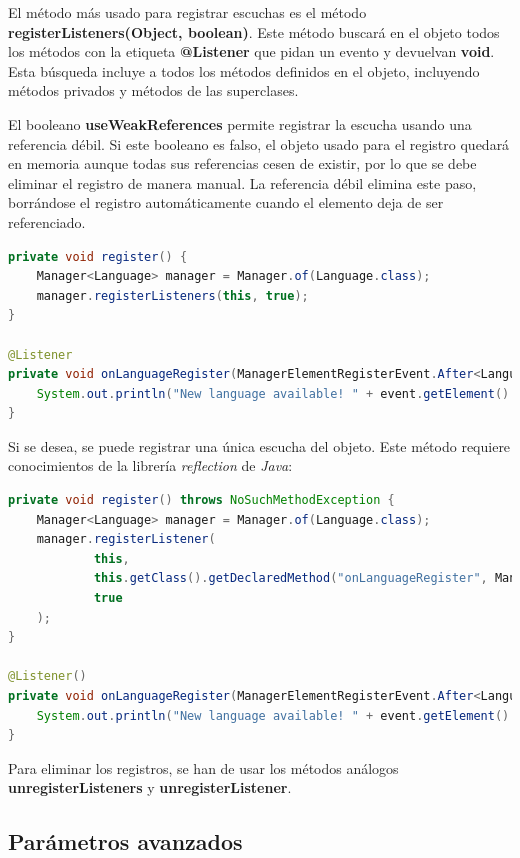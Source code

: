 \noindent El método más usado para registrar escuchas es el método
\textbf{registerListeners(Object, boolean)}.
Este método buscará en el objeto todos los métodos con la etiqueta \textbf{@Listener}
que pidan un evento y devuelvan \textbf{void}.
Esta búsqueda incluye a todos los métodos definidos en el objeto,
incluyendo métodos privados y métodos de las superclases.

\noindent El booleano \textbf{useWeakReferences} permite registrar la escucha usando una referencia débil.
Si este booleano es falso, el objeto usado para el registro quedará en memoria aunque todas
sus referencias cesen de existir, por lo que se debe eliminar el registro de manera manual.
La referencia débil elimina este paso, borrándose el registro automáticamente cuando
el elemento deja de ser referenciado.

\begin{lstlisting}[language=Java,style=java,frame=single,label={lst:registrar-escuchas}]
private void register() {
    Manager<Language> manager = Manager.of(Language.class);
    manager.registerListeners(this, true);
}

@Listener
private void onLanguageRegister(ManagerElementRegisterEvent.After<Language> event) {
    System.out.println("New language available! " + event.getElement().getName());
}
\end{lstlisting}

\noindent Si se desea, se puede registrar una única escucha del objeto.
Este método requiere conocimientos de la librería \textit{reflection} de \textit{Java}:

\begin{lstlisting}[language=Java,style=java,frame=single,label={lst:registrar-escuchas-2}]
private void register() throws NoSuchMethodException {
    Manager<Language> manager = Manager.of(Language.class);
    manager.registerListener(
            this,
            this.getClass().getDeclaredMethod("onLanguageRegister", ManagerElementRegisterEvent.class),
            true
    );
}

@Listener()
private void onLanguageRegister(ManagerElementRegisterEvent.After<Language> event) {
    System.out.println("New language available! " + event.getElement().getName());
}
\end{lstlisting}

\noindent Para eliminar los registros, se han de usar los métodos análogos
\textbf{unregisterListeners} y \textbf{unregisterListener}.

\subsection{Parámetros avanzados}\label{subsec:parámetros-avanzados}

